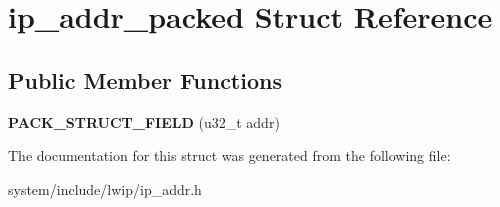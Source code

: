\hypertarget{structip__addr__packed}{}\section{ip\+\_\+addr\+\_\+packed Struct Reference}
\label{structip__addr__packed}
\subsection*{Public Member Functions}
\begin{DoxyCompactItemize}
\item 
\hypertarget{structip__addr__packed_ad9a337a45101464bb2e6e54c5b0292de}{}{\bfseries P\+A\+C\+K\+\_\+\+S\+T\+R\+U\+C\+T\+\_\+\+F\+I\+E\+L\+D} (u32\+\_\+t addr)\label{structip__addr__packed_ad9a337a45101464bb2e6e54c5b0292de}

\end{DoxyCompactItemize}


The documentation for this struct was generated from the following file\+:\begin{DoxyCompactItemize}
\item 
system/include/lwip/ip\+\_\+addr.\+h\end{DoxyCompactItemize}
